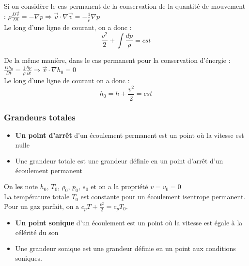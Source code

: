 \documentclass[../main.tex]{subfiles}
\begin{document}
Si on considère le cas permanent de la conservation de la quantité de mouvement : $\rho \frac{D\Vec{v}}{Dt} = -\nabla p \Rightarrow \Vec{v} \cdot \nabla \Vec{v} = -\frac{1}{\rho} \nabla p$\\
Le long d'une ligne de courant, on a donc : \begin{equation}
    \frac{v^2}{2} + \int \frac{dp}{\rho} = cst
\end{equation}

De la même manière, dans le cas permanent pour la conservation d'énergie : $\frac{D h_0}{Dt} = \frac{1}{\rho} \frac{\partial p}{\partial t} \Rightarrow \Vec{v} \cdot \nabla h_0 = 0$\\
Le long d'une ligne de courant on a donc : \begin{equation}
    h_0 = h + \frac{v^2}{2} = cst
\end{equation}

\subsubsection{Grandeurs totales}
\begin{itemize}
    \item \textbf{Un point d'arrêt} d'un écoulement permanent est un point où la vitesse est nulle\\
    \item Une grandeur totale est une grandeur définie en un point d'arrêt d'un écoulement permanent\\
\end{itemize}

On les note $h_0$, $T_0$, $\rho_0$, $p_0$, $s_0$ et on a la propriété $v = v_0 = 0$\\

La température totale $T_0$ est constante pour un écoulement isentrope permanent.\\

Pour un gaz parfait, on a $c_pT + \frac{v^2}{2} = c_p T_0$.\\

\begin{itemize}
    \item \textbf{Un point sonique} d'un écoulement est un point où la vitesse est égale à la célérité du son\\
    \item Une grandeur sonique est une grandeur définie en un point aux conditions soniques.\\
\end{itemize}
\end{document}
